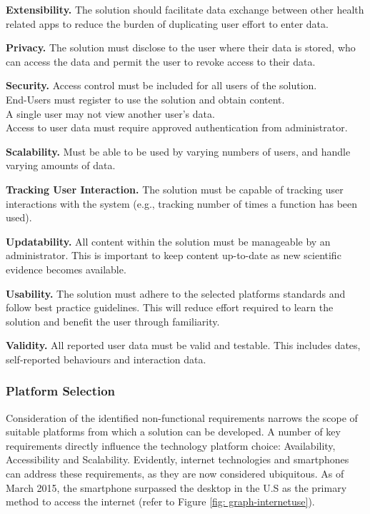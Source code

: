 \textbf{Extensibility.}
The solution should facilitate data exchange between other health related apps to reduce the burden of duplicating user effort to enter data.

\textbf{Privacy.}
The solution must disclose to the user where their data is stored, who can access the data and permit the user to revoke access to their data.

\textbf{Security.}
Access control must be included for all users of the solution.
\\End-Users must register to use the solution and obtain content.
\\A single user may not view another user's data.
\\Access to user data must require approved authentication from administrator.

\textbf{Scalability.}
Must be able to be used by varying numbers of users, and handle varying amounts of data.

\textbf{Tracking User Interaction.}
The solution must be capable of tracking user interactions with the system (e.g., tracking number of times a function has been used).

\textbf{Updatability.}
All content within the solution must be manageable by an administrator. This is important to keep content up-to-date as new scientific evidence becomes available.

\textbf{Usability.}
The solution must adhere to the selected platforms standards and follow best practice guidelines. This will reduce effort required to learn the solution and benefit the user through familiarity.

\textbf{Validity.}
All reported user data must be valid and testable. This includes dates, self-reported behaviours and interaction data.

\subsubsection{Platform Selection}
Consideration of the identified non-functional requirements narrows the scope of suitable platforms from which a solution can be developed. A number of key requirements directly influence the technology platform choice: Availability, Accessibility and Scalability.
Evidently, internet technologies and smartphones can address these  requirements, as they are now considered ubiquitous. As of March 2015, the smartphone surpassed the desktop in the U.S as the primary method to access the internet \cite{ComScore} (refer to Figure \ref{fig: graph-internetuse}).

